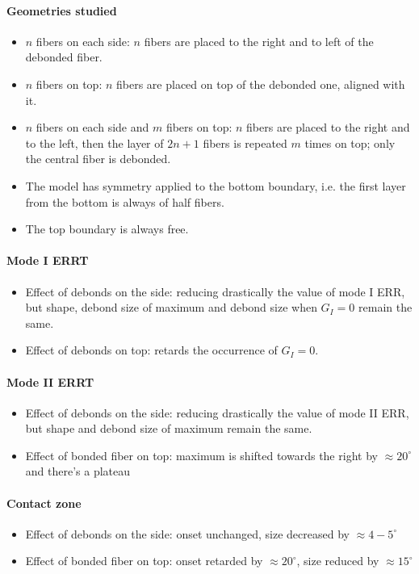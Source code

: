 \documentclass[review]{elsarticle}
\begin{document}
\paragraph{Geometries studied} 
\begin{itemize}
\item $n$ fibers on each side: $n$ fibers are placed to the right and to left of the debonded fiber.
\item $n$ fibers on top: $n$ fibers are placed on top of the debonded one, aligned with it.
\item $n$ fibers on each side and $m$ fibers on top: $n$ fibers are placed to the right and to the left, then the layer of $2n+1$ fibers is repeated $m$ times on top; only the central fiber is debonded.
\item The model has symmetry applied to the bottom boundary, i.e. the first layer from the bottom is always of half fibers.
\item The top boundary is always free.
\end{itemize}

\paragraph{Mode I ERRT}
\begin{itemize}
\item Effect of debonds on the side: reducing drastically the value of mode I ERR, but shape, debond size of maximum and debond size when $G_{I}=0$ remain the same.
\item Effect of debonds on top: retards the occurrence of $G_{I}=0$.
\end{itemize}

\paragraph{Mode II ERRT}
\begin{itemize}
\item Effect of debonds on the side: reducing drastically the value of mode II ERR, but shape and debond size of maximum remain the same.
\item Effect of bonded fiber on top: maximum is shifted towards the right by $\approx 20^{\circ}$ and there's a plateau 
\end{itemize}

\paragraph{Contact zone}
\begin{itemize}
\item Effect of debonds on the side: onset unchanged, size decreased by $\approx 4-5^{\circ}$
\item Effect of bonded fiber on top: onset retarded by $\approx 20^{\circ}$, size reduced by  $\approx 15^{\circ}$
\end{itemize}
\end{document}
